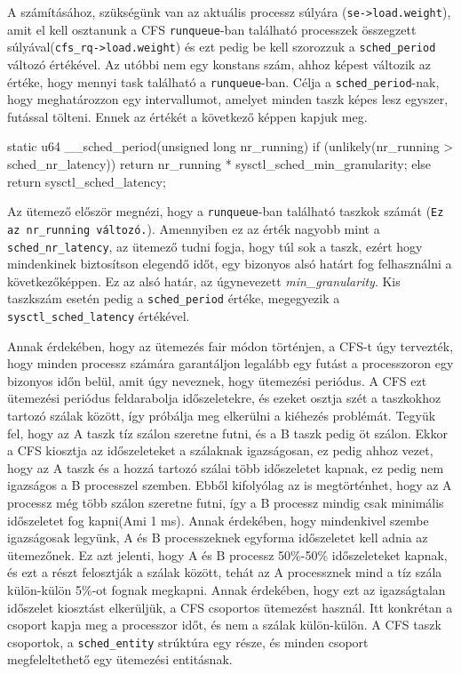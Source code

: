 A számításához, szükségünk van az aktuális processz súlyára (\texttt{se->load.weight}), amit el kell osztanunk a CFS \texttt{runqueue}-ban található processzek összegzett súlyával(\texttt{cfs\_rq->load.weight}) és ezt pedig be kell szorozzuk a \texttt{sched\_period} változó értékével. Az utóbbi nem egy konstans szám, ahhoz képest változik az értéke, hogy mennyi task található a \texttt{runqueue}-ban. Célja a \texttt{sched\_period}-nak, hogy meghatározzon egy intervallumot, amelyet minden taszk képes lesz egyszer, futással tölteni.
Ennek az értékét a következő képpen kapjuk meg.

\begin{cpp}
static u64 __sched_period(unsigned long nr_running)
{
	if (unlikely(nr_running > sched_nr_latency))
		return nr_running * sysctl_sched_min_granularity;
	else
		return sysctl_sched_latency;
}
\end{cpp}

Az ütemező először megnézi, hogy a \texttt{runqueue}-ban található taszkok számát (\texttt{Ez az nr\_running változó.}). 
Amennyiben ez az érték nagyobb mint a \texttt{sched\_nr\_latency}, az ütemező tudni fogja, hogy túl sok a taszk, ezért hogy mindenkinek biztosítson elegendő időt, egy bizonyos alsó határt fog felhasználni a következőképpen. Ez az alsó határ, az úgynevezett \textit{min\_granularity}. Kis taszkszám esetén pedig a \texttt{sched\_period} értéke, megegyezik a  \texttt{sysctl\_sched\_latency} értékével.


Annak érdekében, hogy az ütemezés fair módon történjen, a CFS-t úgy tervezték, hogy minden processz számára garantáljon legalább egy futást a processzoron egy bizonyos időn belül, amit úgy neveznek, hogy ütemezési periódus.
A CFS ezt ütemezési periódus feldarabolja időszeletekre, és ezeket osztja szét a taszkokhoz tartozó szálak között, így próbálja meg elkerülni a kiéhezés problémát. 
Tegyük fel, hogy az A taszk tíz szálon szeretne futni, és a B taszk pedig öt szálon. Ekkor a CFS kiosztja az időszeleteket a szálaknak igazságosan, ez pedig ahhoz vezet, hogy az A taszk és a hozzá tartozó szálai több időszeletet kapnak, ez pedig nem igazságos a B processzel szemben.
Ebből kifolyólag az is megtörténhet, hogy az A processz még több szálon szeretne futni, így a B processz mindig csak minimális időszeletet fog kapni(Ami 1 ms). Annak érdekében, hogy mindenkivel szembe igazságosak legyünk, A és B processzeknek egyforma időszeletet kell adnia az ütemezőnek. Ez azt jelenti, hogy A és B processz 50\%-50\% időszeleteket kapnak, és ezt a részt felosztják a szálak között, tehát az A processznek mind a tíz szála külön-külön 5\%-ot fognak megkapni.
Annak érdekében, hogy ezt az igazságtalan időszelet kiosztást elkerüljük, a CFS csoportos ütemezést használ. Itt konkrétan a csoport kapja meg a processzor időt, és nem a szálak külön-külön.
A CFS taszk csoportok, a \texttt{sched\_entity} strúktúra egy része, és minden csoport megfeleltethető egy ütemezési entitásnak.

